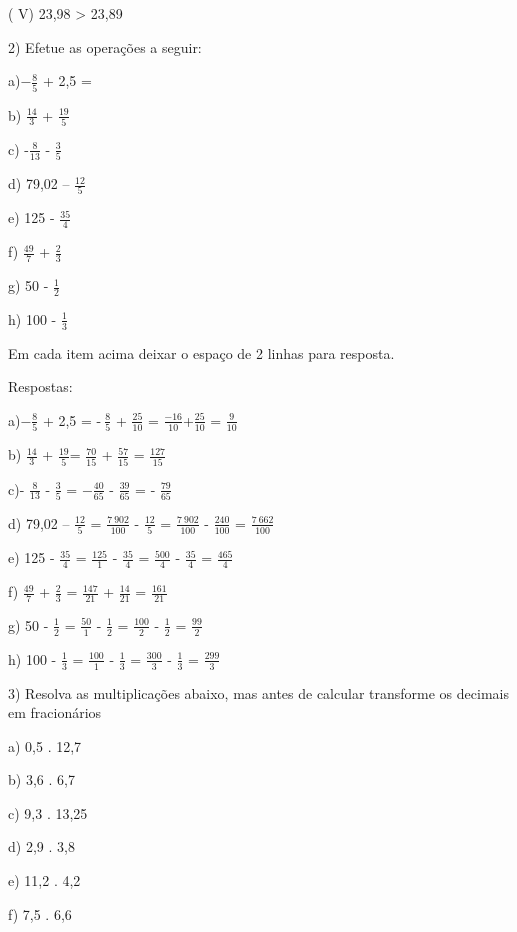 ( V) 23,98 \textgreater{} 23,89

2) Efetue as operações a seguir:

a)\(- \frac{8}{5}\) + 2,5 =

b) \(\frac{14}{3}\) + \(\frac{19}{5}\)

c) -\(\frac{8}{13}\) - \(\frac{3}{5}\)

d) 79,02 -- \(\frac{12}{5}\)

e) 125 - \(\frac{35}{4}\)

f) \(\frac{49}{7}\) + \(\frac{2}{3}\)

g) 50 - \(\frac{1}{2}\)

h) 100 - \(\frac{1}{3}\)

Em cada item acima deixar o espaço de 2 linhas para resposta.

Respostas:

a)\(- \frac{8}{5}\) + 2,5 = -\(\ \frac{8}{5}\) + \(\frac{25}{10}\) =
\(\frac{- 16}{10}\)+\(\frac{25}{10}\) = \(\frac{9}{10}\)

b) \(\frac{14}{3}\) + \(\frac{19}{5}\)= \(\frac{70}{15}\) +
\(\frac{57}{15}\) = \(\frac{127}{15}\)

c)- \(\frac{8}{13}\) - \(\frac{3}{5}\) = \(- \frac{40}{65}\) -
\(\frac{39}{65}\) = - \(\frac{79}{65}\)

d) 79,02 -- \(\frac{12}{5}\) = \(\frac{7\ 902}{100}\) - \(\frac{12}{5}\)
= \(\frac{7\ 902}{100}\) - \(\frac{240}{100}\) = \(\frac{7\ 662}{100}\)

e) 125 - \(\frac{35}{4}\) = \(\frac{125}{1}\) - \(\frac{35}{4}\) =
\(\frac{500}{4}\) - \(\frac{35}{4}\) = \(\frac{465}{4}\)

f) \(\frac{49}{7}\) + \(\frac{2}{3}\) = \(\frac{147}{21}\) +
\(\frac{14}{21}\) = \(\frac{161}{21}\)

g) 50 - \(\frac{1}{2}\) = \(\frac{50}{1}\) - \(\frac{1}{2}\) =
\(\frac{100}{2}\) - \(\frac{1}{2}\) = \(\frac{99}{2}\)

h) 100 - \(\frac{1}{3}\) = \(\frac{100}{1}\) - \(\frac{1}{3}\) =
\(\frac{300}{3}\) - \(\frac{1}{3}\) = \(\frac{299}{3}\)

3) Resolva as multiplicações abaixo, mas antes de calcular transforme os
decimais em fracionários

a) 0,5 . 12,7

b) 3,6 . 6,7

c) 9,3 . 13,25

d) 2,9 . 3,8

e) 11,2 . 4,2

f) 7,5 . 6,6

